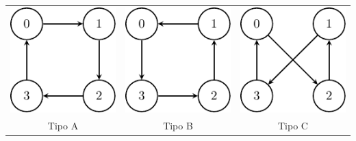 \documentclass[11pt]{article}
\begin{document}
\begin{table}[H]
	\centering
	\begin{tabular}{ccc}		
		\includegraphics[scale=.9]{figures/salesman-cycleA.pdf} &
		\includegraphics[scale=.9]{figures/salesman-cycleB.pdf} &
		\includegraphics[scale=.9]{figures/salesman-cycleC.pdf} \\
		
		Tipo A & Tipo B & Tipo C \\
		

\end{tabular}
\end{table}
\end{document}
